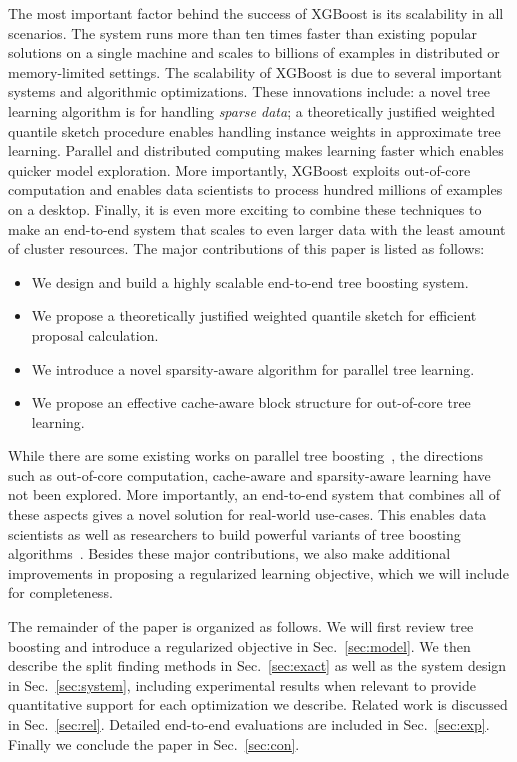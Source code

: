 \documentclass{sig-alternate-05-2015}
\begin{document}
The most important factor behind the success of XGBoost is its scalability in all scenarios.
The system runs more than ten times faster than existing popular solutions on a single machine and scales to billions of examples in distributed or memory-limited settings.
The scalability of XGBoost is due to several important systems and algorithmic optimizations.  These innovations include:
a novel tree learning algorithm is for handling \emph{sparse data}; a theoretically justified weighted quantile sketch procedure enables handling instance weights in
 approximate tree learning.
Parallel and distributed computing makes learning faster which enables quicker model exploration.
More importantly, XGBoost exploits out-of-core computation and enables data scientists to process hundred millions of examples on a desktop.
Finally, it is even more exciting to combine these techniques to make an end-to-end system that scales to even larger data with the least amount of cluster resources.
The major contributions of this paper is listed as follows:
\begin{itemize}
  \item We design and build a highly scalable end-to-end tree boosting system.
  \item We propose a theoretically justified weighted quantile sketch for efficient proposal calculation.
  \item We introduce a novel sparsity-aware algorithm for parallel tree learning.
  \item We propose an effective cache-aware block structure for out-of-core tree learning.
\end{itemize}

While there are some existing works on parallel tree boosting~\cite{tyree2011parallel,Ye:GBDT,PLANet},
the directions such as out-of-core computation, cache-aware and sparsity-aware learning have not been explored.
More importantly, an end-to-end system that combines all of these aspects gives a novel solution for real-world use-cases. This enables data scientists as well as researchers to build powerful variants of tree boosting algorithms~\cite{Chen:ICML2013,Chen:AISTATS2015}.
Besides these major contributions, we also make additional improvements in proposing a regularized learning objective, which we will include for completeness.

The remainder of the paper is organized as follows. We will first review tree boosting and introduce a regularized objective in Sec.~\ref{sec:model}. We then describe the split finding methods in Sec.~\ref{sec:exact} as well as the system design in Sec.~\ref{sec:system}, including experimental results when relevant to provide quantitative support for each optimization we describe. Related work is discussed in Sec.~\ref{sec:rel}.
Detailed end-to-end evaluations  are included in Sec.~\ref{sec:exp}.
Finally we conclude the paper in Sec.~\ref{sec:con}.
\end{document}
